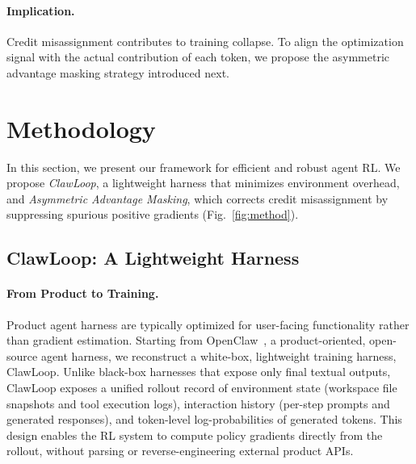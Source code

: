 \documentclass[letterpaper]{article} %
\begin{document}
\paragraph{Implication.}
Credit misassignment contributes to training collapse.
To align the optimization signal with the actual contribution of each token, we propose the asymmetric advantage masking strategy introduced next.

\section{Methodology}
In this section, we present our framework for efficient and robust agent RL.
We propose \emph{ClawLoop}, a lightweight harness that minimizes environment overhead, and \emph{Asymmetric Advantage Masking}, which corrects credit misassignment by suppressing spurious positive gradients (Fig.~\ref{fig:method}).

\subsection{ClawLoop: A Lightweight Harness}
\label{subsec:nanoclaw}

\paragraph{From Product to Training.}
Product agent harness are typically optimized for user-facing functionality rather than gradient estimation.
Starting from OpenClaw~\citep{openclaw}, a product-oriented, open-source agent harness, we reconstruct a white-box, lightweight training harness, {ClawLoop}.
Unlike black-box harnesses that expose only final textual outputs, ClawLoop exposes a unified rollout record of environment state (workspace file snapshots and tool execution logs), interaction history (per-step prompts and generated responses), and token-level log-probabilities of generated tokens.
This design enables the RL system to compute policy gradients directly from the rollout, without parsing or reverse-engineering external product APIs.
\end{document}
